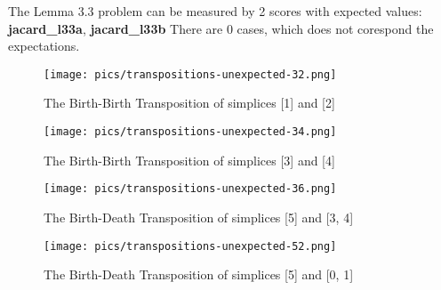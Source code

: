 \documentclass{article}
\begin{document}
    \par The Lemma 3.3 problem can be measured by 2 scores with expected 
    values: \textbf{jacard\_l33a}, \textbf{jacard\_l33b}
    There are 0 cases, which does not corespond the expectations. 
    
    \begin{figure}[ht]
    \centering
    \texttt{[image: pics/transpositions-unexpected-32.png]}
    \caption{The Birth-Birth Transposition of simplices [1] and [2]}
    \label{fig:unexpected32}
    \end{figure}
    
    \begin{figure}[ht]
    \centering
    \texttt{[image: pics/transpositions-unexpected-34.png]}
    \caption{The Birth-Birth Transposition of simplices [3] and [4]}
    \label{fig:unexpected34}
    \end{figure}
    
    \begin{figure}[ht]
    \centering
    \texttt{[image: pics/transpositions-unexpected-36.png]}
    \caption{The Birth-Death Transposition of simplices [5] and [3, 4]}
    \label{fig:unexpected36}
    \end{figure}
    
    \begin{figure}[ht]
    \centering
    \texttt{[image: pics/transpositions-unexpected-52.png]}
    \caption{The Birth-Death Transposition of simplices [5] and [0, 1]}
    \label{fig:unexpected52}
    \end{figure}
    
\end{document}
